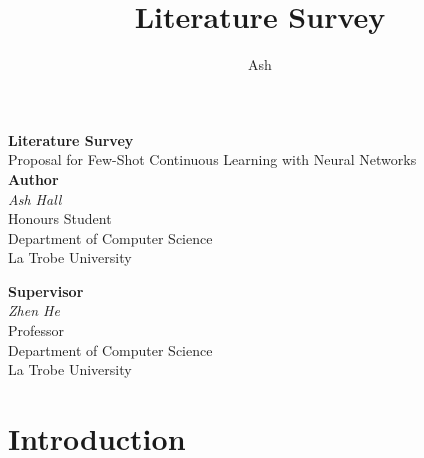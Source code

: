 \documentclass{report}
\title{Literature Survey}
\author{Ash}
\begin{document}
	\begin{titlepage}
		\begin{center}
		\vspace*{5cm}
		{\huge \textbf{Literature Survey}} \\
		\vspace{0.3cm}
		{\large Proposal for Few-Shot Continuous Learning with Neural Networks} \\
		\vspace*{2cm}
		\textbf{Author} \\
		\textit{Ash Hall} \\
		Honours Student \\
		Department of Computer Science \\
		La Trobe University \\		
		\vspace{0.75cm}
		
		\textbf{Supervisor} \\
		\textit{Zhen He} \\
		Professor \\
		Department of Computer Science \\
		La Trobe University \\

		
		\vfill
		\end{center}
	\end{titlepage}
	\thispagestyle{empty}
	\newpage
	\thispagestyle{empty}
	\tableofcontents
	\newpage
	\thispagestyle{empty}
	\listoffigures
	\newpage
	
	\chapter{Introduction}
\end{document}
